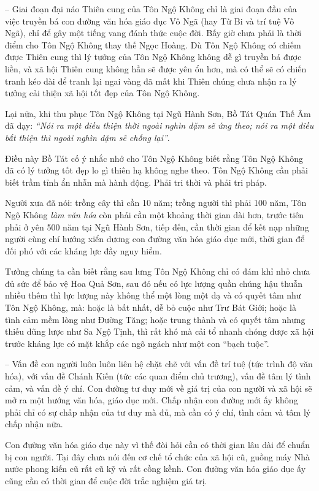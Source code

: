 -- Giai đoạn đại náo Thiên cung của Tôn Ngộ Không chỉ là giai đoạn đầu của việc truyền bá con đường văn hóa giáo dục Vô Ngã (hay Từ Bi và trí tuệ Vô Ngã), chỉ để gây một tiếng vang đánh thức cuộc đời. Bấy giờ chưa phải là thời điểm cho Tôn Ngộ Không thay thế Ngọc Hoàng. Dù Tôn Ngộ Không có chiếm được Thiên cung thì lý tưởng của Tôn Ngộ Không không dễ gì truyền bá được liền, và xã hội Thiên cung không hẳn sẽ được yên ổn hơn, mà có thể sẽ có chiến tranh kéo dài để tranh lại ngai vàng đã mất khi Thiên chúng chưa nhận ra lý tưởng cải thiện xã hội tốt đẹp của Tôn Ngộ Không.

Lại nữa, khi thu phục Tôn Ngộ Không tại Ngũ Hành Sơn, Bồ Tát Quán Thế Âm đã dạy: \emph{``Nói ra một điều thiện thời ngoài nghìn dặm sẽ ứng theo; nói ra một điều bất thiện thì ngoài nghìn dặm sẽ chống lại''}.

Điều này Bồ Tát cố ý nhắc nhở cho Tôn Ngộ Không biết rằng Tôn Ngộ Không đã có lý tưởng tốt đẹp lo gì thiên hạ không nghe theo. Tôn Ngộ Không cần phải biết trầm tỉnh ẩn nhẫn mà hành động. Phải tri thời và phải tri pháp.

Người xưa đã nói: trồng cây thì cần 10 năm; trồng người thì phải 100 năm, Tôn Ngộ Không \emph{làm văn hóa} còn phải cần một khoảng thời gian dài hơn, trước tiên phải ở yên 500 năm tại Ngũ Hành Sơn, tiếp đến, cần thời gian để kết nạp những người cùng chí hướng xiển dương con đường văn hóa giáo dục mới, thời gian để đối phó với các kháng lực đầy nguy hiểm.

Tưởng chúng ta cần biết rằng sau lưng Tôn Ngộ Không chỉ có đám khỉ nhỏ chưa đủ sức để bảo vệ Hoa Quả Sơn, sau đó nếu có lực lượng quần chúng hậu thuẫn nhiều thêm thì lực lượng này không thể một lòng một dạ và có quyết tâm như Tôn Ngộ Không, mà: hoặc là bất nhất, dễ bỏ cuộc như Trư Bát Giới; hoặc là tình cảm mềm lòng như Đường Tăng; hoặc trung thành và có quyết tâm nhưng thiếu dũng lược như Sa Ngộ Tịnh, thì rất khó mà cải tổ nhanh chóng được xã hội trước kháng lực có mặt khắp các ngõ ngách như một con ``bạch tuộc''.

-- Vấn đề con người luôn luôn liên hệ chặt chẽ với vấn đề trí tuệ (tức trình độ văn hóa), với vấn đề Chánh Kiến (tức các quan điểm chủ trương), vấn đề tâm lý tình cảm, và vấn đề ý chí. Con đường tư duy mới về giá trị của con người và xã hội sẽ mở ra một hướng văn hóa, giáo dục mới. Chấp nhận con đường mới ấy không phải chỉ có sự chấp nhận của tư duy mà đủ, mà cần có ý chí, tình cảm và tâm lý chấp nhận nữa.

Con đường văn hóa giáo dục này vì thế đòi hỏi cần có thời gian lâu dài để chuẩn bị con người. Tại đây chưa nói đến cơ chế tổ chức của xã hội cũ, guồng máy Nhà nước phong kiến cũ rất cũ kỹ và rất cồng kềnh. Con đường văn hóa giáo dục ấy cũng cần có thời gian để cuộc đời trắc nghiệm giá trị.

